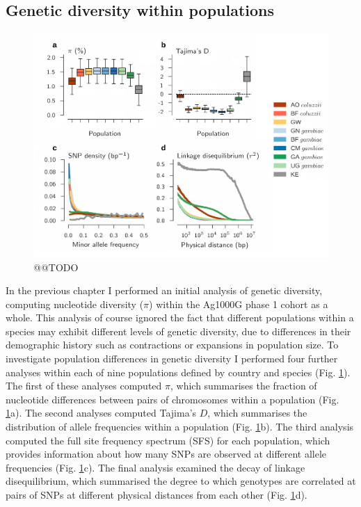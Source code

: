 \documentclass[a4paper,11pt,abstracton,hidelinks]{scrartcl}
\begin{document}
\subsection{Genetic diversity within populations}\label{subsec:diversity}


\begin{figure}[t!]
\centering
\includegraphics[width=1\textwidth]{artwork/chapter4/pop_params.pdf}
\caption{@@TODO
%
}
\label{fig:diversity}
\end{figure}


In the previous chapter I performed an initial analysis of genetic diversity, computing nucleotide diversity ($\pi$) within the Ag1000G phase 1 cohort as a whole.
%
This analysis of course ignored the fact that different populations within a species may exhibit different levels of genetic diversity, due to differences in their demographic history such as contractions or expansions in population size.
%
To investigate population differences in genetic diversity I performed four further analyses within each of nine populations defined by country and species (Fig. \ref{fig:diversity}).
%
The first of these analyses computed $\pi$, which summarises the fraction of nucleotide differences between pairs of chromosomes within a population (Fig. \ref{fig:diversity}a).
%
The second analyses computed Tajima's $D$, which summarises the distribution of allele frequencies within a population (Fig. \ref{fig:diversity}b).
%
The third analysis computed the full site frequency spectrum (SFS) for each population, which provides information about how many SNPs are observed at different allele frequencies (Fig. \ref{fig:diversity}c).
%
The final analysis examined the decay of linkage disequilibrium, which summarised the degree to which genotypes are correlated at pairs of SNPs at different physical distances from each other (Fig. \ref{fig:diversity}d).
%
\end{document}
